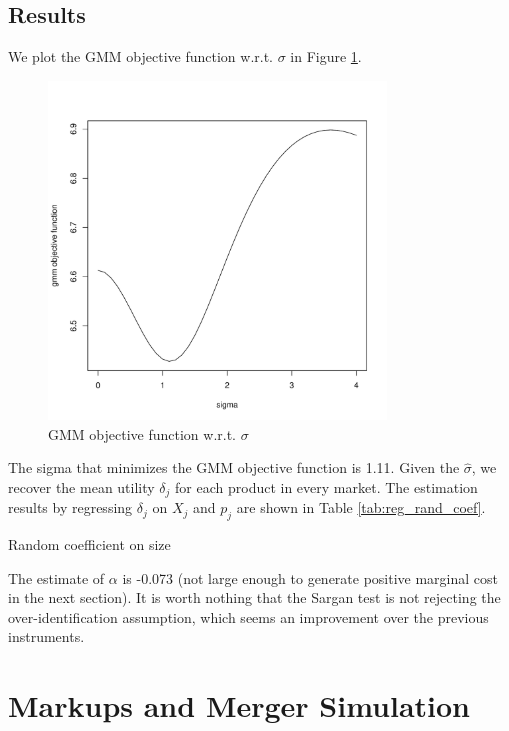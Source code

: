 \documentclass[12pt]{article}[margin=1in]
\begin{document}
\subsection{Results}
We plot the GMM objective function w.r.t. $\sigma$ in Figure
\ref{fig:iv_local_diff}.

\begin{figure}[h!]
    \centering
    \includegraphics[width=0.8\textwidth]{../Results/Figures/gmm_obj_iv_instr.pdf}
    \caption{GMM objective function w.r.t. $\sigma$}
    \label{fig:iv_local_diff}
\end{figure}

The sigma that minimizes the GMM objective function is 1.11. Given the
$\hat{\sigma}$, we recover the mean utility $\delta_j$ for each product in
every market. The estimation results by regressing $\delta_j$ on $X_j$ and
$p_j$ are shown in Table \ref{tab:reg_rand_coef}.

\begin{table}[h!]
    \fontsize{10pt}{12pt}\selectfont
    \centering
    
    \caption{Random coefficient on size}
    \label{tab:reg_rand_coef}
\end{table}

The estimate of $\alpha$ is -0.073 (not large enough to generate positive
marginal cost in the next section). It is worth nothing that the Sargan test is
not rejecting the over-identification assumption, which seems an improvement
over the previous instruments.

\section{Markups and Merger Simulation}
\end{document}
